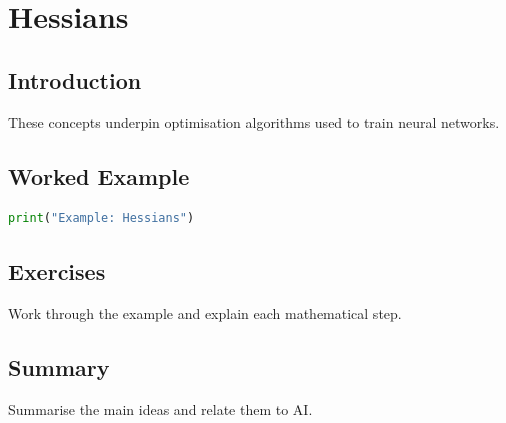 \chapter{Hessians}
\label{chap:vol4-19}



\section{Introduction}
These concepts underpin optimisation algorithms used to train neural networks.

\section{Worked Example}
\begin{lstlisting}[language=Python]
print("Example: Hessians")
\end{lstlisting}

\section{Exercises}
\begin{exercise}
Work through the example and explain each mathematical step.
\end{exercise}

\section{Summary}
Summarise the main ideas and relate them to AI.
